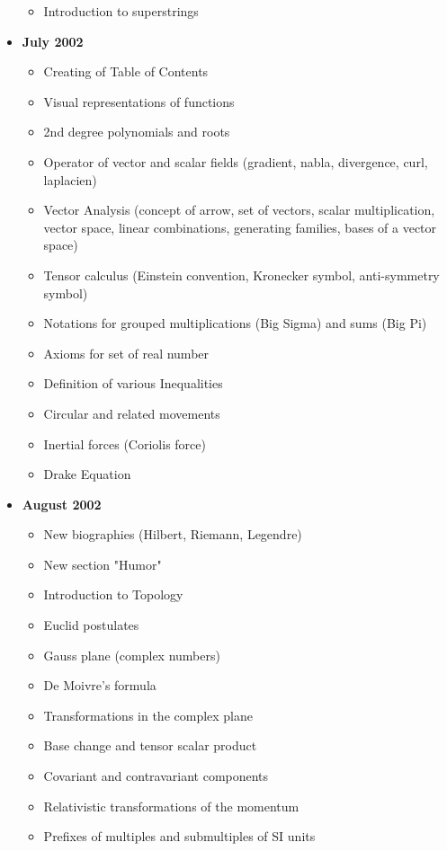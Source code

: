 \documentclass[12pt,a4paper,twoside,openright]{report}
\theoremstyle{definition}
\theoremstyle{itexmp}
\numberwithin{equation}{section}
\begin{document}
\begin{itemize}
\begin{itemize}[noitemsep]
				\item Introduction to superstrings
			\end{itemize}
		\item \textbf{July 2002}
			\begin{itemize}[noitemsep]
				\item Creating of Table of Contents
				\item Visual representations of functions
				\item 2nd degree polynomials and roots
				\item Operator of vector and scalar fields (gradient, nabla, divergence, curl, laplacien)
				\item Vector Analysis (concept of arrow, set of vectors, scalar multiplication, vector space, linear combinations, generating families, bases of a vector space)
				\item Tensor calculus (Einstein convention, Kronecker symbol, anti-symmetry symbol)
				\item Notations for grouped multiplications (Big Sigma) and sums (Big Pi)
				\item Axioms for set of real number 
				\item Definition of various Inequalities 
				\item Circular and related movements
				\item Inertial forces (Coriolis force)
				\item Drake Equation
			\end{itemize}
		\item \textbf{August 2002}
			\begin{itemize}[noitemsep]
				\item New biographies (Hilbert, Riemann, Legendre)
				\item New section "Humor"
				\item Introduction to Topology
				\item Euclid postulates
				\item Gauss plane (complex numbers)
				\item De Moivre's formula
				\item Transformations in the complex plane
				\item Base change and tensor scalar product
				\item Covariant and contravariant components
				\item Relativistic transformations of the momentum
				\item Prefixes of multiples and submultiples of SI units

\end{itemize}
\end{itemize}
\end{document}
